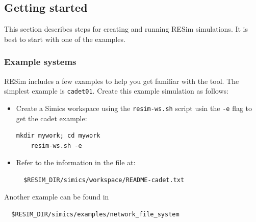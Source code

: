 \documentclass[titlepage]{article}
\begin{document}
\subsection{Getting started}
\label{getting-started}
This section describes steps for creating and running RESim simulations.
It is best to start with one of the examples.

\subsubsection{Example systems}
RESim includes a few examples to help you get familiar with the tool.  
The simplest example is {\tt cadet01}.  Create this example simulation as follows:
\begin{itemize}
\item Create a Simics workspace using the {\tt resim-ws.sh} script usin the {\tt -e} flag to get the cadet example:
\begin{verbatim}
mkdir mywork; cd mywork
    resim-ws.sh -e
\end{verbatim}
\item Refer to the information in the file at:
\begin{verbatim}
  $RESIM_DIR/simics/workspace/README-cadet.txt
\end{verbatim}
\end{itemize}

Another example can be found in
\begin{verbatim}
  $RESIM_DIR/simics/examples/network_file_system
\end{verbatim}
\end{document}
